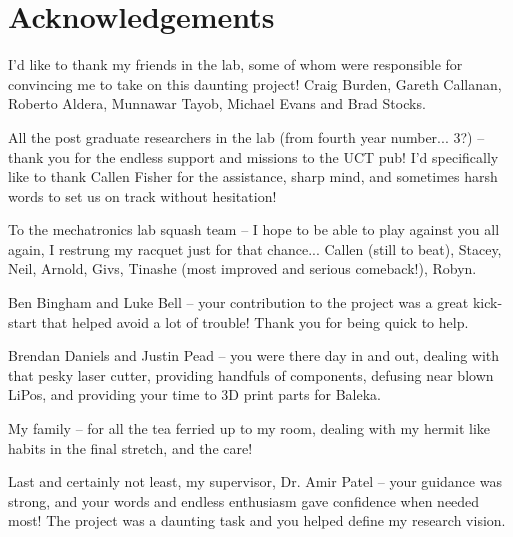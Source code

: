 \chapter{Acknowledgements}
I'd like to thank my friends in the lab, some of whom were responsible for convincing me to take on this daunting project! Craig Burden, Gareth Callanan, Roberto Aldera, Munnawar Tayob, Michael Evans and Brad Stocks. 

All the post graduate researchers in the lab (from fourth year number... 3?) -- thank you for the endless support and missions to the UCT pub! I'd specifically like to thank Callen Fisher for the assistance, sharp mind, and sometimes harsh words to set us on track without hesitation! 

To the mechatronics lab squash team -- I hope to be able to play against you all again, I restrung my racquet just for that chance... Callen (still to beat), Stacey, Neil, Arnold, Givs, Tinashe (most improved and serious comeback!), Robyn.

Ben Bingham and Luke Bell -- your contribution to the project was a great kick-start that helped avoid a lot of trouble! Thank you for being quick to help.

Brendan Daniels and Justin Pead -- you were there day in and out, dealing with that pesky laser cutter, providing handfuls of components, defusing near blown LiPos, and providing your time to 3D print parts for Baleka.

My family -- for all the tea ferried up to my room, dealing with my hermit like habits in the final stretch, and the care!

Last and certainly not least, my supervisor, Dr. Amir Patel -- your guidance was strong, and your words and endless enthusiasm gave confidence when needed most! The project was a daunting task and you helped define my research vision.
